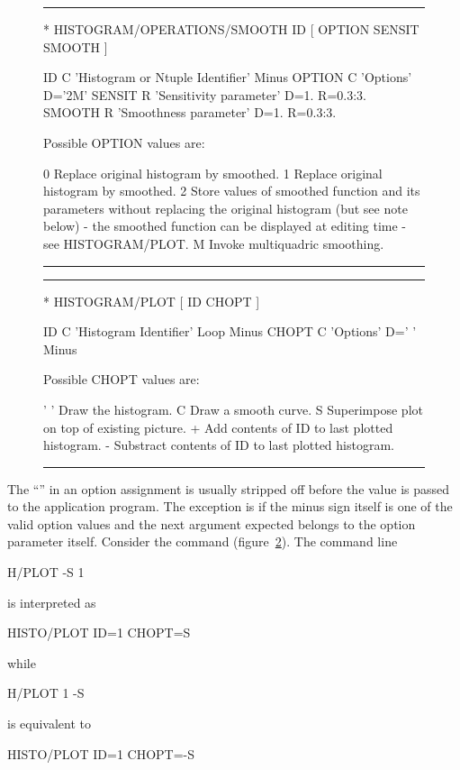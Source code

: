 \begin{figure}[htb]\centering
\hrule
\vspace{.5\baselineskip}
\begin{XMP}
 * HISTOGRAM/OPERATIONS/SMOOTH ID [ OPTION SENSIT SMOOTH ]

   ID         C 'Histogram or Ntuple Identifier' Minus
   OPTION     C 'Options' D='2M'
   SENSIT     R 'Sensitivity parameter' D=1. R=0.3:3.
   SMOOTH     R 'Smoothness parameter' D=1. R=0.3:3.

   Possible OPTION values are:

    0  Replace original histogram by smoothed.
    1  Replace original histogram by smoothed.
    2  Store values of smoothed function and its parameters without replacing
       the original histogram (but see note below) - the smoothed function can
       be displayed at editing time - see HISTOGRAM/PLOT.
    M  Invoke multiquadric smoothing.
\vspace{-1cm}
\end{XMP}
\caption{
\label{fig-help-smooth}}
\hrule
\end{figure}

\begin{figure}[htb]\centering
\hrule
\vspace{.5\baselineskip}
\begin{XMP}
 * HISTOGRAM/PLOT [ ID CHOPT ]

   ID         C 'Histogram Identifier' Loop Minus
   CHOPT      C 'Options' D=' ' Minus

   Possible CHOPT values are:

   ' '     Draw the histogram.
    C      Draw a smooth curve.
    S      Superimpose plot on top of existing picture.
    +      Add contents of ID to last plotted histogram.
    -      Substract contents of ID to last plotted histogram.
\vspace{-1cm}
\end{XMP}
\caption{
\label{fig-help-hiplot}}
\hrule
\end{figure}

The ``\Lit{-}'' in an option assignment is usually stripped off
before the value is passed to the application program.
The exception is if the minus sign itself is one of the valid option
values and the next argument expected belongs to the option parameter itself.
Consider the 
\ifPAWman\else\PAW{}\fi
command 
(figure~\ref{fig-help-hiplot}).
The command line 
\begin{XMP}
H/PLOT -S 1
\end{XMP}
is interpreted as
\begin{XMP}
HISTO/PLOT ID=1 CHOPT=S
\end{XMP}
while
\begin{XMP}
H/PLOT 1 -S
\end{XMP}
is equivalent to
\begin{XMP}
HISTO/PLOT ID=1 CHOPT=-S
\end{XMP}



